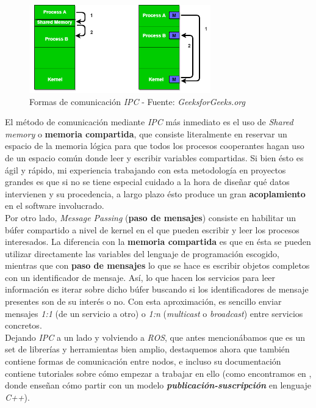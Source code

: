 \begin{figure}[h]
	\centering
	\includegraphics[width=0.7\textwidth]{imagenes/ipc.png}
	\caption{Formas de comunicación \textit{IPC} - Fuente: \textit{GeeksforGeeks.org} \cite{ipc}}
\end{figure}

El método de comunicación mediante \textit{IPC} más inmediato es el uso de \textit{Shared memory} o \textbf{memoria compartida}, que consiste literalmente en reservar un espacio de la memoria lógica para que todos los procesos cooperantes hagan uso de un espacio común donde leer y escribir variables compartidas. Si bien ésto es ágil y rápido, mi experiencia trabajando con esta metodología en proyectos grandes es que si no se tiene especial cuidado a la hora de diseñar qué datos intervienen y su procedencia, a largo plazo ésto produce un gran \textbf{acoplamiento} en el software involucrado.\\

Por otro lado, \textit{Message Passing} (\textbf{paso de mensajes}) consiste en habilitar un búfer compartido a nivel de kernel en el que pueden escribir y leer los procesos interesados. La diferencia con la \textbf{memoria compartida} es que en ésta se pueden utilizar directamente las variables del lenguaje de programación escogido, mientras que con \textbf{paso de mensajes} lo que se hace es escribir objetos completos con un identificador de mensaje. Así, lo que hacen los servicios para leer información es iterar sobre dicho búfer buscando si los identificadores de mensaje presentes son de su interés o no. Con esta aproximación, es sencillo enviar mensajes \textit{1:1} (de un servicio a otro) o \textit{1:n} (\textit{multicast} o \textit{broadcast}) entre servicios concretos.\\

Dejando \textit{IPC} a un lado y volviendo a \textit{ROS}, que antes mencionábamos que es un set de librerías y herramientas bien amplio, destaquemos ahora que también contiene formas de comunicación entre nodos, e incluso su documentación contiene tutoriales sobre cómo empezar a trabajar en ello (como encontramos en \cite{ros-tutorial}, donde enseñan cómo partir con un modelo \textbf{\textit{publicación-suscripción}} en lenguaje \textit{C++}).\\

